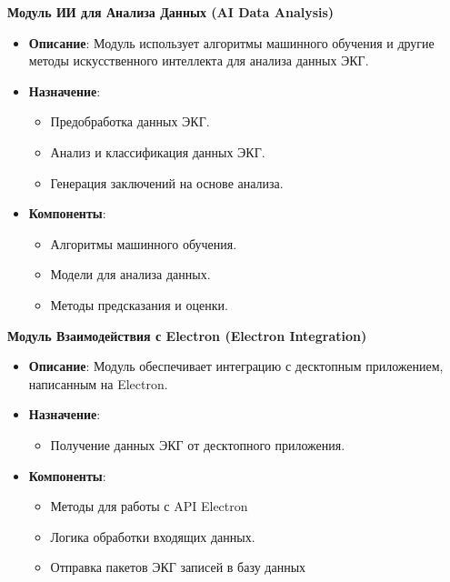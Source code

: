 \documentclass[12pt, russian]{extarticle}
\begin{document}
\begin{spacing}{1.5}
\par \noindent \textbf{Модуль ИИ для Анализа Данных (AI Data Analysis)}
\begin{itemize}
    \item \textbf{Описание}: Модуль использует алгоритмы машинного обучения и другие методы искусственного интеллекта для анализа данных ЭКГ.
    \item \textbf{Назначение}:
    \begin{itemize}
        \item Предобработка данных ЭКГ.
        \item Анализ и классификация данных ЭКГ.
        \item Генерация заключений на основе анализа.
    \end{itemize}
    \item \textbf{Компоненты}:
    \begin{itemize}
        \item Алгоритмы машинного обучения.
        \item Модели для анализа данных.
        \item Методы предсказания и оценки.
    \end{itemize}
\end{itemize}

\par \noindent \textbf{Модуль Взаимодействия с Electron (Electron Integration)}
\begin{itemize}
    \item \textbf{Описание}: Модуль обеспечивает интеграцию с десктопным приложением, написанным на Electron.
    \item \textbf{Назначение}:
    \begin{itemize}
        \item Получение данных ЭКГ от десктопного приложения.
    \end{itemize}
    \item \textbf{Компоненты}:
    \begin{itemize}
        \item Методы для работы с API Electron
        \item Логика обработки входящих данных.
        \item Отправка пакетов ЭКГ записей в базу данных
    \end{itemize}
\end{itemize}


\end{spacing}
\end{document}
